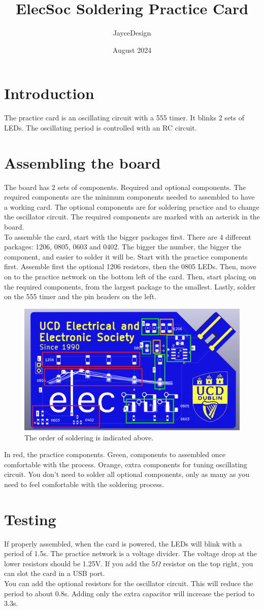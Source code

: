 \documentclass{article}
\title{ElecSoc Soldering Practice Card}
\author{JayceDesign}
\date{August 2024}
\begin{document}
\maketitle

\section{Introduction}
The practice card is an oscillating circuit with a 555 timer. It blinks 2 sets of LEDs. The oscillating period is controlled with an RC circuit.

\section{Assembling the board}
The board has 2 sets of components. Required and optional components. The required components are the minimum components needed to assembled to have a working card. The optional components are for soldering practice and to change the oscillator circuit. The required components are marked with an asterisk in the board.\\
To assemble the card, start with the bigger packages first. There are 4 different packages: 1206, 0805, 0603 and 0402. The bigger the number, the bigger the component, and easier to solder it will be. Start with the practice components first. Assemble first the optional 1206 resistors, then the 0805 LEDs. Then, move on to the practice network on the bottom left of the card. Then, start placing on the required components, from the largest package to the smallest. Lastly, solder on the 555 timer and the pin headers on the left.
\begin{figure} [H]
    \centering
    \includegraphics[width=0.6\linewidth]{Practice board marked.png}
    \caption{The order of soldering is indicated above.}
    \label{fig:enter-label}
\end{figure}
In red, the practice components. Green, components to assembled once comfortable with the process. Orange, extra components for tuning oscillating circuit. You don't need to solder all optional components, only as many as you need to feel comfortable with the soldering process.
\section{Testing}
If properly assembled, when the card is powered, the LEDs will blink with a period of 1.5s. The practice network is a voltage divider. The voltage drop at the lower resistors should be 1.25V. If you add the 5$\Omega$ resistor on the top right, you can slot the card in a USB port.\\
You can add the optional resistors for the oscillator circuit. This will reduce the period to about 0.8s. Adding only the extra capacitor will increase the period to 3.3s.
\end{document}
